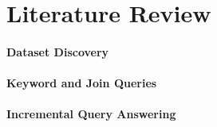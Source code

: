 \section{Literature Review}
\label{sec:background}
\paragraph{Dataset Discovery}
\paragraph{Keyword and Join Queries}
\paragraph{Incremental Query Answering}
